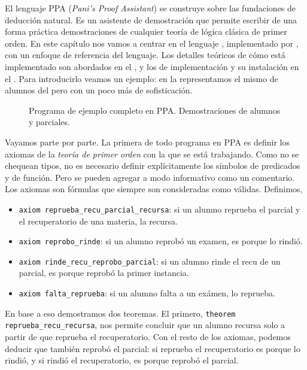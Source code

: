 El lenguaje PPA (\textit{Pani's Proof Assistant}) se construye sobre las
fundaciones de deducción natural. Es un asistente de demostración que permite
escribir de una forma práctica demostraciones de cualquier teoría de lógica
clásica de primer orden. En este capítulo nos vamos a centrar en el lenguaje
\ppaLang{}, implementado por \ppaTool{}, con un enfoque de referencia del
lenguaje. Los detalles teóricos de cómo está implementado son abordados en el
, y los de implementación y su instalación en el
. Para introducirlo veamos un ejemplo: en la
 representamos el mismo de alumnos del
 pero con un poco más de sofisticación.

\begin{figure}
    
    \caption{Programa de ejemplo completo en PPA. Demostraciones de alumnos y parciales.}
    \label{ppa:prog:alumnos}
\end{figure}

Vayamos parte por parte. La primera de todo programa en PPA es definir
los axiomas de la \textit{teoría de primer orden} con la que se está trabajando.
Como no se chequean tipos, no es necesario definir explícitamente los símbolos
de predicados y de función. Pero se pueden agregar a modo informativo como un
comentario. Los axiomas son fórmulas que siempre son consideradas como válidas.
Definimos,
\begin{itemize}
    \item \lstinline{axiom reprueba_recu_parcial_recursa}: si un alumno reprueba el
    parcial y el recuperatorio de una materia, la recursa.
    \item \lstinline{axiom reprobo_rinde}: si un alumno reprobó un examen, es porque lo
    rindió.
    \item \lstinline{axiom rinde_recu_reprobo_parcial}: si un alumno rinde el recu de
    un parcial, es porque reprobó la primer instancia.
    \item \lstinline{axiom falta_reprueba}: si un alumno falta a un exámen, lo reprueba.
\end{itemize}
\lstset{firstnumber=last}


En base a eso demostramos dos teoremas. El primero, \lstinline{theorem reprueba_recu_recursa}, nos permite concluir que un alumno recursa solo a partir
de que reprueba el recuperatorio. Con el resto de los axiomas, podemos deducir
que también reprobó el parcial: si reprueba el recuperatorio es porque lo
rindió, y si rindió el recuperatorio, es porque reprobó el parcial.

